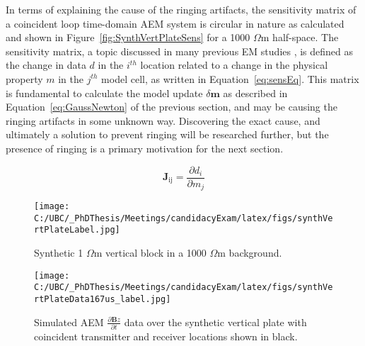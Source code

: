 \documentclass[letterpaper,11pt]{article}
\newcommand{\om}{{$\Omega$m }}
\begin{document}
In terms of explaining the cause of the ringing artifacts, the sensitivity matrix of a coincident loop time-domain AEM system is circular in nature as calculated and shown in Figure~\ref{fig:SynthVertPlateSens} for a 1000 \om half-space. The sensitivity matrix, a topic discussed in many previous EM studies \cite[]{McGillivray1994,Farquharson1996,Hordt1998,Newman2005}, is defined as the change in data $ d $ in the $ \mathit{i}^{th} $ location related to a change in the physical property $ m $ in the $ \mathit{j}^{th} $ model cell, as written in Equation~\ref{eq:sensEq}.  This matrix is fundamental to calculate the model update $ \delta \mathbf{m} $ as described in Equation~\ref{eq:GaussNewton} of the previous section, and may be causing the ringing artifacts in some unknown way.  Discovering the exact cause, and ultimately a solution to prevent ringing will be researched further, but the presence of ringing is a primary motivation for the next section.

\begin{equation}
\mathbf{J_{\mathrm{ij}}} = \frac{\partial d_i}{\partial m_j}
\label{eq:sensEq}
\end{equation} 


\begin{figure}[h]
\centering
\begin{minipage}{.45\textwidth}
\centering
\texttt{[image: C:/UBC/\_PhDThesis/Meetings/candidacyExam/latex/figs/synthVertPlateLabel.jpg]}
\caption{Synthetic 1 \om vertical block in \newline a 1000 \om background.}
\label{fig:SynthVertPlate}
\end{minipage}
\begin{minipage}{.45\textwidth}
\centering
\texttt{[image: C:/UBC/\_PhDThesis/Meetings/candidacyExam/latex/figs/synthVertPlateData167us\_label.jpg]}
\caption{Simulated AEM $ \frac{\partial\mathbf{B}z}{\partial t} $ data over the synthetic vertical plate with coincident transmitter and receiver locations shown in black.}
\label{fig:SynthVertPlateData}
\end{minipage}
\end{figure}
\end{document}
